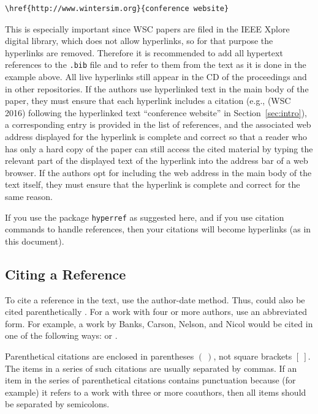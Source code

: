 \documentclass{wscpaperproc}
\theoremstyle{wsc}
\begin{document}
\begin{verbatim}
\href{http://www.wintersim.org}{conference website}
\end{verbatim}\vspace{5 mm}


\noindent This is especially important since WSC papers are filed in the IEEE Xplore digital library, which does not allow hyperlinks, so for that purpose the hyperlinks are removed.
Therefore it is recommended to add all hypertext references to the {\tt .bib} file and to refer to them from the text as it is done in the example above.
All live hyperlinks still appear in the CD of the proceedings and in other repositories.
If the authors use hyperlinked text in the main body of the paper, they must ensure that each hyperlink includes a citation (e.g., (WSC 2016) following the hyperlinked text ``conference website'' in Section~\ref{sec:intro}), a corresponding entry is provided in the list of references, and the associated web address displayed for the hyperlink is complete and correct so that a reader who has only a hard copy of the paper can still access the cited material by typing the relevant part of the displayed text of the hyperlink into the address bar of a web browser.
If the authors opt for including the web address in the main body of the text itself, they must ensure that the hyperlink is complete and correct for the same reason.

If you use the package {\tt hyperref} as suggested here, and if you use citation commands to handle references, then your citations will
become hyperlinks (as in this document).

\subsection{Citing a Reference}
To cite a reference in the text, use the author-date method. Thus,  could also be cited parenthetically \cite{chi89}.
For a work with four or more authors, use an abbreviated form. For example, a work by Banks, Carson, Nelson, and Nicol would be cited in one of the
following ways:
 or .

Parenthetical citations are enclosed in parentheses $(~)$, not square brackets $[~]$.
The items in a series of such citations are usually separated by commas.
If an item in the series of parenthetical citations contains punctuation because (for example) it refers to a work with three or more coauthors, then all items should be separated by semicolons.
\end{document}
